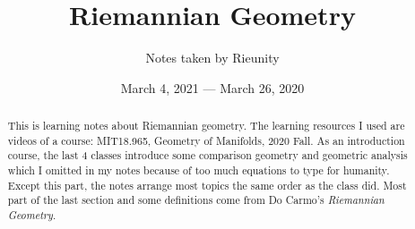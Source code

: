 \documentclass[a4paper,12pt]{article}
\begin{document}
\title{Riemannian Geometry}
\author{\large Notes taken by Rieunity}
\date{March 4, 2021 --- March 26, 2020}  
\maketitle
\begin{abstract}
  This is learning notes about Riemannian geometry. The learning resources I used are videos of a course: MIT18.965, Geometry of Manifolds, 2020 Fall. As an introduction course, the last 4 classes introduce some comparison geometry and geometric analysis which I omitted in my notes because of too much equations to type for humanity. Except this part, the notes arrange most topics the same order as the class did. Most part of the last section and some definitions come from Do Carmo's \textit{Riemannian Geometry}.
\end{abstract}
\tableofcontents


%
%
\end{document}
